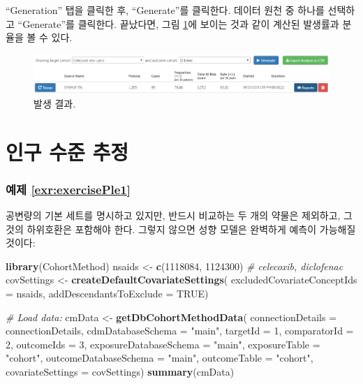 \documentclass[11pt]{book}
\newenvironment{Shaded}{\begin{snugshade}}{\end{snugshade}}
\newcommand{\KeywordTok}[1]{\textcolor[rgb]{0.13,0.29,0.53}{\textbf{#1}}}
\newcommand{\DataTypeTok}[1]{\textcolor[rgb]{0.13,0.29,0.53}{#1}}
\newcommand{\DecValTok}[1]{\textcolor[rgb]{0.00,0.00,0.81}{#1}}
\newcommand{\StringTok}[1]{\textcolor[rgb]{0.31,0.60,0.02}{#1}}
\newcommand{\CommentTok}[1]{\textcolor[rgb]{0.56,0.35,0.01}{\textit{#1}}}
\newcommand{\OtherTok}[1]{\textcolor[rgb]{0.56,0.35,0.01}{#1}}
\newcommand{\NormalTok}[1]{#1}
\theoremstyle{definition}
\theoremstyle{definition}
\theoremstyle{definition}
\theoremstyle{remark}
\begin{document}
``Generation'' 탭을 클릭한 후, ``Generate''를 클릭한다. 데이터 원천 중
하나를 선택하고 ``Generate''를 클릭한다. 끝났다면, 그림
\ref{fig:irResults}에 보이는 것과 같이 계산된 발생률과 분율을 볼 수
있다.

\begin{figure}

{\centering \includegraphics[width=1\linewidth]{images/SuggestedAnswers/irResults} 

}

\caption{발생 결과.}\label{fig:irResults}
\end{figure}

\section{인구 수준 추정}\label{Pleanswers}

\subsubsection*{예제 \ref{exr:exercisePle1}}\label{-refexrexerciseple1}

공변량의 기본 세트를 명시하고 있지만, 반드시 비교하는 두 개의 약물은
제외하고, 그것의 하위호환은 포함해야 한다. 그렇지 않으면 성향 모델은
완벽하게 예측이 가능해질 것이다:

\begin{Shaded}
\begin{Highlighting}[]
\KeywordTok{library}\NormalTok{(CohortMethod)}
\NormalTok{nsaids <-}\StringTok{ }\KeywordTok{c}\NormalTok{(}\DecValTok{1118084}\NormalTok{, }\DecValTok{1124300}\NormalTok{) }\CommentTok{# celecoxib, diclofenac}
\NormalTok{covSettings <-}\StringTok{ }\KeywordTok{createDefaultCovariateSettings}\NormalTok{(}
  \DataTypeTok{excludedCovariateConceptIds =}\NormalTok{ nsaids,}
  \DataTypeTok{addDescendantsToExclude =} \OtherTok{TRUE}\NormalTok{)}

\CommentTok{# Load data:}
\NormalTok{cmData <-}\StringTok{ }\KeywordTok{getDbCohortMethodData}\NormalTok{(}
  \DataTypeTok{connectionDetails =}\NormalTok{ connectionDetails,}
  \DataTypeTok{cdmDatabaseSchema =} \StringTok{"main"}\NormalTok{,}
  \DataTypeTok{targetId =} \DecValTok{1}\NormalTok{,}
  \DataTypeTok{comparatorId =} \DecValTok{2}\NormalTok{,}
  \DataTypeTok{outcomeIds =} \DecValTok{3}\NormalTok{,}
  \DataTypeTok{exposureDatabaseSchema =} \StringTok{"main"}\NormalTok{,}
  \DataTypeTok{exposureTable =} \StringTok{"cohort"}\NormalTok{,}
  \DataTypeTok{outcomeDatabaseSchema =} \StringTok{"main"}\NormalTok{,}
  \DataTypeTok{outcomeTable =} \StringTok{"cohort"}\NormalTok{,}
  \DataTypeTok{covariateSettings =}\NormalTok{ covSettings)}
\KeywordTok{summary}\NormalTok{(cmData)}
\end{Highlighting}
\end{Shaded}
\end{document}

